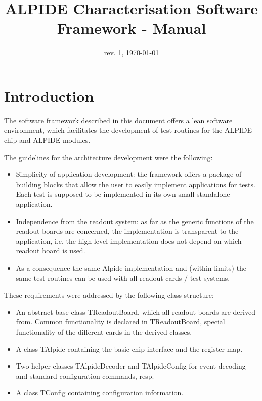 \documentclass{article}
\begin{document}
\title{ALPIDE Characterisation Software Framework - Manual}
\date{rev. 1, \today}

\maketitle


\section{Introduction}

The software framework described in this document offers a lean
software environment, which facilitates the development of test
routines for the ALPIDE chip and ALPIDE modules.

The guidelines for the architecture development were the following: 

\begin{itemize}
\item Simplicity of application development: the framework offers
  a package of building blocks that allow the user to easily implement
  applications for tests. Each test is supposed to be implemented in
  its own small standalone application.
\item Independence from the readout system: as far as the generic
  functions of the readout boards are concerned, the implementation
  is transparent to the application, i.e. the high level
  implementation does not depend on which readout board is used.  
\item As a consequence the same Alpide implementation and (within
  limits) the same test routines can be used with all readout cards /
  test systems.
\end{itemize}


These requirements were addressed by the following class structure:
\begin{itemize}
\item An abstract base class TReadoutBoard, which all readout boards
  are derived from. Common functionality is declared in TReadoutBoard,
  special functionality of the different cards in the derived
  classes. 
\item A class TAlpide containing the basic chip interface and the
  register map. 
\item Two helper classes TAlpideDecoder and TAlpideConfig for event
  decoding and standard configuration commands, resp.
\item A class TConfig containing configuration information.
\end{itemize}
\end{document}
